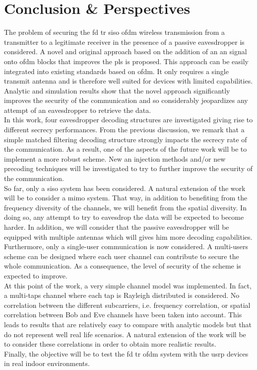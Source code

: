 \section{Conclusion \& Perspectives}
\label{sec:ccl}
The problem of securing the \gls{fd} \gls{tr} \gls{siso} \gls{ofdm} wireless transmission from a transmitter to a legitimate receiver in the presence of a passive eavesdropper is considered. A novel and original approach based on the addition of an \gls{an} signal onto \gls{ofdm} blocks that improves the \gls{pls} is proposed. This approach can be easily integrated into existing standards based on \gls{ofdm}. It only requires a single transmit antenna and is therefore well suited for devices with limited capabilities. Analytic and simulation results show that the novel approach significantly improves the security of the communication and so considerably jeopardizes any attempt of an eavesdropper to retrieve the data. \\

In this work, four eavesdropper decoding structures are investigated giving rise to different secrecy performances. From the previous discussion, we remark that a simple matched filtering decoding structure strongly impacts the secrecy rate of the communication. As a result, one of the aspects of the future work will be to implement a more robust scheme. New \gls{an} injection methods and/or new precoding techniques will be investigated to try to further improve the security of the communication. \\

So far, only a \gls{siso} system has been considered. A natural extension of the work will be to consider a \gls{mimo} system. That way, in addition to benefiting from the  frequency diversity of the channels, we will benefit from the spatial diversity. In doing so, any attempt to try to eavesdrop the data will be expected to become harder. In addition, we will consider that the passive eavesdropper will be equipped with multiple antennas which will gives him more decoding capabilities. \\

Furthermore, only a single-user communication is now considered. A multi-users scheme can be designed where each user channel can contribute to secure the whole communication. As a consequence, the level of security of the scheme is expected to improve.\\

At this point of the work, a very simple channel model was implemented. In fact, a multi-taps channel where each tap is Rayleigh distributed is considered. No correlation between the different subcarriers, i.e. frequency correlation, or spatial correlation between Bob and Eve channels have been taken into account. This leads to results that are relatively easy to compare with analytic models but that do not represent well real life scenarios. A natural extension of the work will be to consider these correlations in order to obtain more realistic results. \\

Finally, the objective will be to test the \gls{fd} \gls{tr} \gls{ofdm} system with the \gls{usrp} devices in real indoor environments.
\label{sec:ccl}

